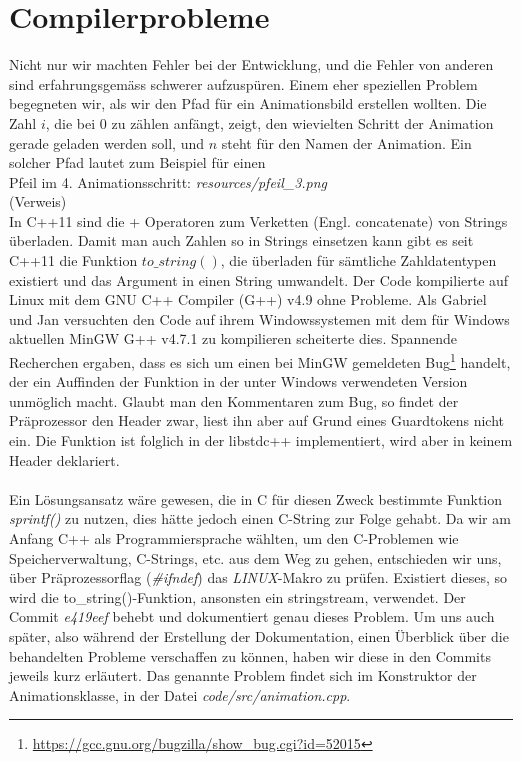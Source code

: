 \documentclass[11pt,a4paper]{scrbook}
\begin{document}
\section{Compilerprobleme}
Nicht nur wir machten Fehler bei der Entwicklung, und die Fehler von anderen sind erfahrungsgemäss schwerer aufzuspüren.
Einem eher speziellen Problem begegneten wir, als wir den Pfad für ein Animationsbild erstellen wollten.
Die Zahl $i$, die bei 0 zu zählen anfängt, zeigt, den wievielten Schritt der Animation gerade geladen werden soll, und $n$ steht für den Namen der Animation.
Ein solcher Pfad lautet zum Beispiel für einen\\Pfeil im 4. Animationsschritt: \textit{resources/pfeil\_3.png}\\ (Verweis)
\\
In C++11 sind die + Operatoren zum Verketten (Engl. concatenate) von Strings überladen. Damit man auch Zahlen so in Strings einsetzen
kann gibt es seit C++11 die Funktion $to\_string()$, die überladen für sämtliche Zahldatentypen existiert und das Argument in einen String
umwandelt. Der Code kompilierte auf Linux mit dem GNU C++ Compiler (G++) v4.9 ohne Probleme. Als Gabriel und Jan versuchten den Code auf ihrem Windowssystemen
mit dem für Windows aktuellen MinGW G++ v4.7.1 zu kompilieren scheiterte dies. Spannende Recherchen ergaben, dass es sich um einen bei MinGW
gemeldeten Bug\footnote{\url{https://gcc.gnu.org/bugzilla/show_bug.cgi?id=52015}} handelt, der ein Auffinden der Funktion in der unter Windows verwendeten
Version unmöglich macht. Glaubt man den Kommentaren zum Bug, so findet der Präprozessor den Header zwar, liest ihn aber auf Grund eines Guardtokens nicht ein.
Die Funktion ist folglich in der libstdc++ implementiert, wird aber in keinem Header deklariert.\\ %
\\
Ein Lösungsansatz wäre gewesen, die in C für diesen Zweck bestimmte Funktion \textit{sprintf()} zu nutzen, dies hätte jedoch einen C-String zur Folge gehabt.
Da wir am Anfang C++ als Programmiersprache wählten, um den C-Problemen wie Speicherverwaltung, C-Strings, etc. aus dem Weg zu gehen, entschieden wir uns, über
Präprozessorflag (\textit{\#ifndef}) das \textit{LINUX}-Makro zu prüfen. Existiert dieses, so wird die to\_string()-Funktion, ansonsten ein stringstream, verwendet.
Der Commit \textit{e419eef} behebt und dokumentiert genau dieses Problem. Um uns auch später, also während der Erstellung der Dokumentation, einen Überblick
über die behandelten Probleme verschaffen zu können, haben wir diese in den Commits jeweils kurz erläutert. Das genannte Problem findet sich im
Konstruktor der Animationsklasse, in der Datei \textit{code/src/animation.cpp}.
\end{document}

